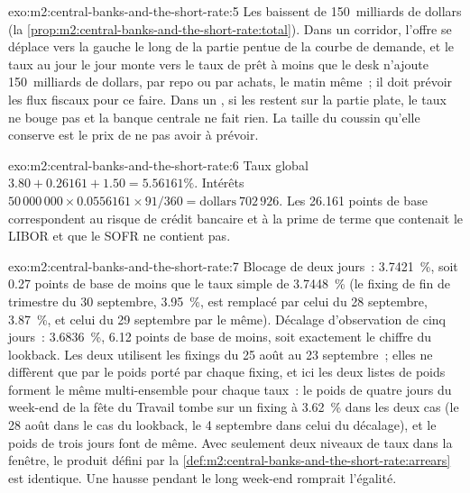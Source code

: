 \begin{solution}{exo:m2:central-banks-and-the-short-rate:5}
Les  baissent de 150~milliards de dollars
(la \cref{prop:m2:central-banks-and-the-short-rate:total}). Dans un corridor,
l'offre se déplace vers la gauche le long de la partie pentue de la courbe de demande, et le taux au jour le jour
monte vers le taux de prêt à moins que le desk n'ajoute 150~milliards de dollars,
par repo ou par achats, le matin même~; il doit prévoir les flux fiscaux pour ce
faire. Dans un , si les  restent sur la partie plate, le taux ne bouge pas et
la banque centrale ne fait rien. La taille du coussin qu'elle conserve est le prix de
ne pas avoir à prévoir.
\end{solution}

\begin{solution}{exo:m2:central-banks-and-the-short-rate:6}
Taux global $3.80 + 0.26161 + 1.50 = 5.56161\%$. Intérêts $50\,000\,000 \times
0.0556161 \times 91/360 = \text{dollars}~702\,926$. Les 26.161 points de base correspondent
au risque de crédit bancaire et à la prime de terme que contenait le LIBOR et que le SOFR ne contient pas.
\end{solution}

\begin{solution}{exo:m2:central-banks-and-the-short-rate:7}
Blocage de deux jours~: 3.7421~\%, soit 0.27 points de base de moins que le taux simple de 3.7448~\%
(le fixing de fin de trimestre du 30 septembre, 3.95~\%, est remplacé par celui du 28 septembre, 3.87~\%, et
celui du 29 septembre par le même). Décalage d'observation de cinq jours~: 3.6836~\%, 6.12
points de base de moins, soit exactement le chiffre du lookback. Les deux utilisent les fixings du 25
août au 23 septembre~; elles ne diffèrent que par le poids porté par chaque fixing,
et ici les deux listes de poids forment le même multi-ensemble pour chaque taux~: le
poids de quatre jours du week-end de la fête du Travail tombe sur un fixing à 3.62~\% dans les deux cas
(le 28 août dans le cas du lookback, le 4 septembre dans celui du décalage), et le
poids de trois jours font de même. Avec seulement deux niveaux de taux dans la fenêtre, le
produit défini par la \cref{def:m2:central-banks-and-the-short-rate:arrears} est
identique. Une hausse pendant le long week-end romprait l'égalité.
\end{solution}

